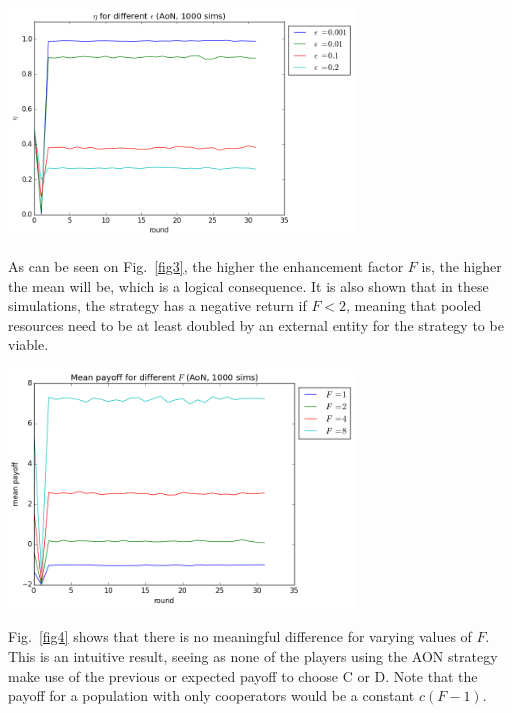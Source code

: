 \documentclass[letterpaper]{article}
\begin{document}
\vspace{5 mm}
\includegraphics[width=3.6in,angle=0]{img/cfraction_epsilon_aon.png}
\label{fig2}
\vspace{5 mm}





As can be seen on Fig.~\ref{fig3}, the higher the enhancement factor $F$ is, the higher the mean will be, which is a logical consequence. It is also shown that in these simulations, the strategy has a negative return if $F<2$, meaning that pooled resources need to be at least doubled by an external entity for the strategy to be viable.


\vspace{5 mm}
\includegraphics[width=3.6in,angle=0]{img/meanpayoff_F_aon.png}
\label{fig3}
\vspace{5 mm}

Fig.~\ref{fig4} shows that there is no meaningful difference for varying values of $F$. This is an intuitive result, seeing as none of the players using the AON strategy make use of the previous or expected payoff to choose C or D. Note that the payoff for a population with only cooperators would be a constant $c(F-1)$.
\end{document}
